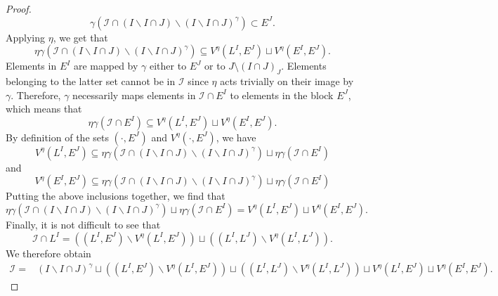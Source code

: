 \documentclass[10pt,a4paper]{amsart}
\begin{document}
\begin{proof}
    $$
		\gamma(\mathcal{I}\cap(I\backslash I\cap J)\backslash(I\backslash I\cap J)^{\gamma}) \subset E^J.
	$$
    Applying $\eta$, we get that
	\begin{equation*}
		\eta\gamma(\mathcal{I}\cap(I\backslash I\cap J)\backslash(I\backslash I\cap J)^{\gamma}) \subseteq V^{\eta}(L^I,E^J)\sqcup V^{\eta}(E^I,E^J).
	\end{equation*}
    Elements in $E^I$ are mapped by $\gamma$ either to $E^J$ or to $J\setminus (I\cap J)_J$. Elements belonging to the latter set cannot be in $\mathcal{I}$ since $\eta$ acts trivially on their image by $\gamma$. Therefore, $\gamma$ necessarily maps elements in $\mathcal{I}\cap E^I$ to elements in the block $E^J$, which means that
    $$
		\eta\gamma(\mathcal{I}\cap E^I) \subseteq V^{\eta}(L^I,E^J)\sqcup V^{\eta}(E^I,E^J).
	$$
    By definition of the sets $(\cdot, E^J)$ and $V^{\eta}(\cdot,E^J)$, we have
    $$
    V^\eta(L^I,E^J)\subseteq \eta\gamma(\mathcal{I}\cap(I\backslash I\cap J)\backslash(I\backslash I\cap J)^{\gamma})\sqcup \eta\gamma(\mathcal{I}\cap E^I)
    $$
    and
    $$
    V^\eta(E^I,E^J) \subseteq \eta\gamma(\mathcal{I}\cap(I\backslash I\cap J)\backslash(I\backslash I\cap J)^{\gamma})\sqcup \eta\gamma(\mathcal{I}\cap E^I)
    $$
    Putting the above inclusions together, we find that
    $$
  \eta\gamma(\mathcal{I}\cap(I\backslash I\cap J)\backslash(I\backslash I\cap J)^{\gamma})\sqcup \eta\gamma(\mathcal{I}\cap E^I) =   V^\eta(L^I,E^J) \sqcup V^\eta(E^I,E^J).
    $$
    Finally, it is not difficult to see that
	\begin{equation*}
		\mathcal{I}\cap L^I= ((L^I,E^J)\backslash V^{\eta}(L^I,E^J))  \sqcup ((L^I,L^J)\backslash V^{\eta}(L^I,L^J)).
	\end{equation*}
	We therefore obtain 
	\begin{align*}
		\mathcal{I} = & (I\backslash I\cap J)^{\gamma} \sqcup ((L^I,E^J)\backslash V^{\eta}(L^I,E^J))       \sqcup ((L^I,L^J)\backslash V^{\eta}(L^I,L^J))                                                  \sqcup V^{\eta}(L^I,E^J)\sqcup  V^{\eta}(E^I,E^J).
	\end{align*}



\end{proof}
\end{document}
